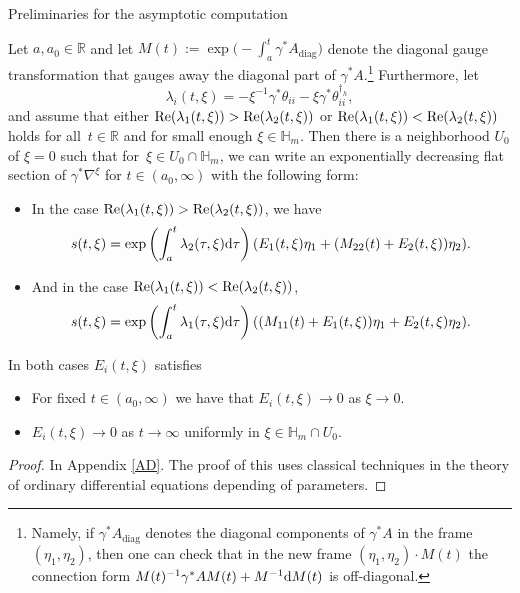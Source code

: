 \begin{subsubsection}{Preliminaries for the asymptotic computation}
\begin{Proposition} \label{prelimasymp} Let $a,a_0\in \mathbb{R}$ and let $M(t):=\exp \bigl(-\int_{a}^{t}\gamma^*A_{\operatorname{diag}}\bigr)$ denote the diagonal gauge transformation that gauges away the diagonal part of $\gamma^*A$.\footnote{Namely, if $\gamma^*A_{\operatorname{diag}}$ denotes the diagonal components of $\gamma^*A$ in the frame $(\eta_1,\eta_2)$, then one can check that in the new frame $(\eta_1,\eta_2)\cdot M(t)$ the connection form $M(t)^{-1}\gamma^*AM(t)+M^{-1}{\rm d}M(t)$ is off-diagonal.} Furthermore, let
\begin{equation*}
 \lambda_i(t,\xi)= -\xi^{-1}\gamma^*\theta_{ii} - \xi \gamma^* \theta^{\dagger_h}_{ii},
\end{equation*}
and assume that either $\textnormal{Re}(\lambda_1(t,\xi))>\textnormal{Re}(\lambda_2(t,\xi))$ or $\textnormal{Re}(\lambda_1(t,\xi))<\textnormal{Re}(\lambda_2(t,\xi))$ holds for all~${t\in \mathbb{R}}$ and for small enough $\xi \in \mathbb{H}_m$. Then there is a neighborhood $U_0$ of $\xi=0$ such that for~${\xi \in U_0\cap \mathbb{H}_m}$, we can write an exponentially decreasing flat section of $\gamma^*\nabla^{\xi}$ for $t\in (a_0,\infty)$ with the following form:
\begin{itemize}\itemsep=0pt
 \item In the case $\textnormal{Re}(\lambda_1(t,\xi))>\textnormal{Re}(\lambda_2(t,\xi))$, we have
 \begin{equation*}
 s(t,\xi)=\exp \left(\int_a^{t}\lambda_2(\tau,\xi){\rm d}\tau\right)(E_1(t,\xi)\eta_1 + (M_{22}(t)+E_2(t,\xi))\eta_2).
 \end{equation*}
 \item And in the case $\textnormal{Re}(\lambda_1(t,\xi))<\textnormal{Re}(\lambda_2(t,\xi))$,
 \begin{equation*}
 s(t,\xi)=\exp \left(\int_a^{t}\lambda_1(\tau,\xi){\rm d}\tau\right)((M_{11}(t)+E_1(t,\xi))\eta_1 + E_2(t,\xi)\eta_2).
 \end{equation*}
\end{itemize}
In both cases $E_i(t,\xi)$ satisfies
\begin{itemize}\itemsep=0pt
 \item For fixed $t \in (a_0,\infty)$ we have that $E_i(t,\xi) \to 0$ as $\xi \to 0$.
 \item $E_i(t,\xi)\to 0$ as $t \to \infty$ uniformly in $\xi \in \mathbb{H}_m\cap U_{0}$.
\end{itemize}
\end{Proposition}
\begin{proof}
In Appendix \ref{AD}. The proof of this uses classical techniques in the theory of ordinary differential equations depending of parameters.
\end{proof}


\end{subsubsection}
